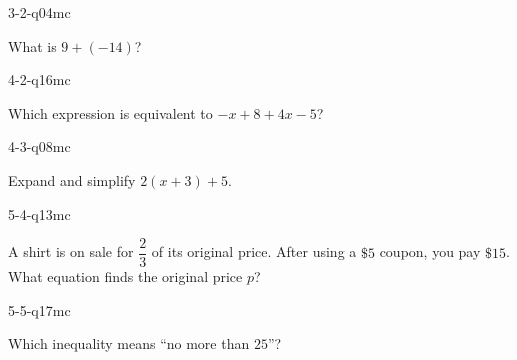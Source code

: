 \begin{practiceQuestion}{3-2-q04}{mc}
\begin{questionText}
What is $9 + (-14)$?
\end{questionText}
\end{practiceQuestion}

\begin{practiceQuestion}{4-2-q16}{mc}
\begin{questionText}
Which expression is equivalent to $-x + 8 + 4x - 5$?
\end{questionText}
\end{practiceQuestion}

\begin{practiceQuestion}{4-3-q08}{mc}
\begin{questionText}
Expand and simplify $2(x + 3) + 5$.
\end{questionText}
\end{practiceQuestion}

\begin{practiceQuestion}{5-4-q13}{mc}
\begin{questionText}
A shirt is on sale for $\dfrac{2}{3}$ of its original price. After using a $\$5$ coupon, you pay $\$15$. What equation finds the original price $p$?
\end{questionText}
\end{practiceQuestion}

\begin{practiceQuestion}{5-5-q17}{mc}
\begin{questionText}
Which inequality means ``no more than $25$''?
\end{questionText}
\end{practiceQuestion}

